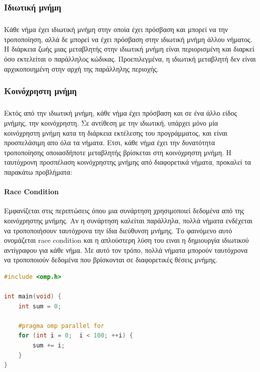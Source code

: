 \documentclass[12pt]{article}
\newcommand{\en}[1]{\foreignlanguage{english}{#1}}
\newcommand{\el}[1]{\selectlanguage{greek}{#1}\selectlanguage{english}}
\begin{document}
\subsubsection{Ιδιωτική μνήμη}
\subparagraph{}
Κάθε νήμα έχει ιδιωτική μνήμη στην οποία έχει πρόσβαση και μπορεί να την τροποποίηση, αλλά δε μπορεί να έχει πρόσβαση στην ιδιωτική μνήμη άλλου νήματος. Η διάρκεια ζωής μιας μεταβλητής στην ιδιωτική μνήμη είναι περιορισμένη και διαρκεί όσο εκτελείται ο παράλληλος κώδικας. Προεπιλεγμένα, η ιδιωτική μεταβλητή δεν είναι αρχικοποιημένη στην αρχή της παράλληλης περιοχής\cite{thenextstep9}.

\clearpage
\subsubsection{Κοινόχρηστη μνήμη}
\subparagraph{}
Εκτός από την ιδιωτική μνήμη, κάθε νήμα έχει πρόσβαση και σε ένα άλλο είδος μνήμης, την  κοινόχρηστη. Σε αντίθεση με την ιδιωτική, υπάρχει μόνο μία κοινόχρηστη μνήμη κατα τη διάρκεια εκτέλεσης του προγράμματος, και είναι προσπελάσιμη απο όλα τα νήματα. Ετσι, κάθε νήμα έχει την δυνατότητα τροποποίησης οποιασδήποτε μεταβλητής βρίσκεται στη κοινόχρηστη μνήμη.
Η ταυτόχρονη προσπέλαση κοινόχρηστης μνήμης από διαφορετικά νήματα, προκαλεί τα παρακάτω προβλήματα:

\paragraph{\en{Race Condition}}

\begin{center}
	\begin{minipage}[t]{0.45\linewidth}
Εμφανίζεται στις περιπτώσεις όπου μια συνάρτηση χρησιμοποιεί δεδομένα από της κοινόχρηστης μνήμης. 
Αν η συνάρτηση καλείται παράλληλα, πολλά νήματα ενδέχεται να τροποποιήσουν ταυτόχρονα την ίδια διεύθυνση μνήμης. Το φαινόμενο αυτό ονομάζεται race condition και η απλούστερη λύση του ειναι η δημιουργία ιδιωτικού αντίγραφου για κάθε νήμα. Με αυτό τον τρόπο, πολλά νήματα μπορούν ταυτόχρονα να τροποποιούν δεδομένα που βρίσκονται σε διαφορετικές θέσεις μνήμης.
	\end{minipage}
	\qquad
	\begin{minipage}[t]{0.47\linewidth}
		\begin{lstlisting}[tabsize=2, basicstyle=\small, language=C++, caption={\el{Παράδειγμα κώδικα με} race condition}, frame=tb]
#include <omp.h>

int main(void) {	
	int sum = 0;

	#pragma omp parallel for
	for (int i = 0;  i < 100; ++i) {
		sum += i;		
	}
}
\end{lstlisting}
	\end{minipage}
\end{center}
\clearpage
\end{document}
